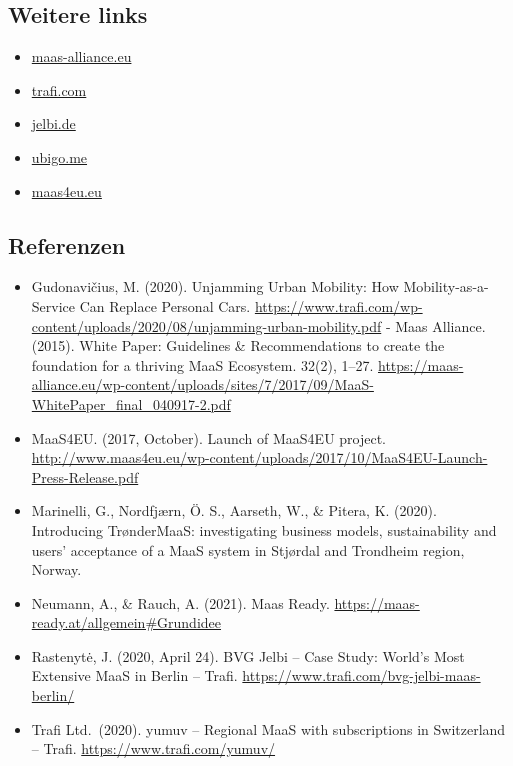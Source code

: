 \documentclass[
]{book}
\providecommand{\tightlist}{%
  \setlength{\itemsep}{0pt}\setlength{\parskip}{0pt}}
\begin{document}
\hypertarget{weitere-links-20}{%
\subsection*{Weitere links}\label{weitere-links-20}}

\begin{itemize}
\tightlist
\item
  \href{https://maas-alliance.eu/wp-content/uploads/sites/7/2017/09/MaaS-WhitePaper_final_040917-2.pdf}{maas-alliance.eu}
\item
  \href{https://www.trafi.com}{trafi.com}
\item
  \href{https://www.jelbi.de}{jelbi.de}
\item
  \href{https://www.ubigo.me/en/about-ubigo}{ubigo.me}
\item
  \href{http://www.maas4eu.eu}{maas4eu.eu}
\end{itemize}

\hypertarget{referenzen-24}{%
\subsection*{Referenzen}\label{referenzen-24}}

\begin{itemize}
\tightlist
\item
  Gudonavičius, M. (2020). Unjamming Urban Mobility: How Mobility-as-a-Service Can Replace Personal Cars. \url{https://www.trafi.com/wp-content/uploads/2020/08/unjamming-urban-mobility.pdf} - Maas Alliance. (2015). White Paper: Guidelines \& Recommendations to create the foundation for a thriving MaaS Ecosystem. 32(2), 1--27. \url{https://maas-alliance.eu/wp-content/uploads/sites/7/2017/09/MaaS-WhitePaper_final_040917-2.pdf}
\item
  MaaS4EU. (2017, October). Launch of MaaS4EU project. \url{http://www.maas4eu.eu/wp-content/uploads/2017/10/MaaS4EU-Launch-Press-Release.pdf}
\item
  Marinelli, G., Nordfjærn, Ö. S., Aarseth, W., \& Pitera, K. (2020). Introducing TrønderMaaS: investigating business models, sustainability and users' acceptance of a MaaS system in Stjørdal and Trondheim region, Norway.
\item
  Neumann, A., \& Rauch, A. (2021). Maas Ready. \url{https://maas-ready.at/allgemein\#Grundidee}
\item
  Rastenytė, J. (2020, April 24). BVG Jelbi -- Case Study: World's Most Extensive MaaS in Berlin -- Trafi. \url{https://www.trafi.com/bvg-jelbi-maas-berlin/}
\item
  Trafi Ltd.~(2020). yumuv -- Regional MaaS with subscriptions in Switzerland -- Trafi. \url{https://www.trafi.com/yumuv/}
\end{itemize}
\end{document}
